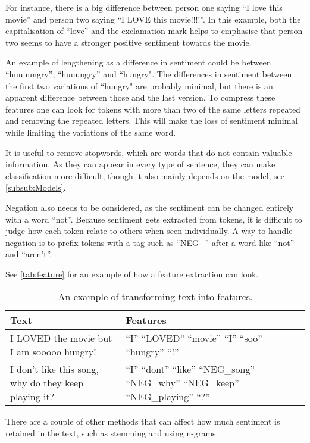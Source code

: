For instance, there is a big difference between person one saying ``I love this
movie'' and person two saying ``I LOVE this movie!!!!''. In this example, both
the capitalisation of ``love'' and the exclamation mark helps to emphasise that
person two seems to have a stronger positive sentiment towards the movie.\nl

An example of lengthening as a difference in sentiment could be between
``huuuungry'', ``huuungry'' and ``hungry". The differences in sentiment between
the first two variations of ``hungry" are probably minimal, but there is an
apparent difference between those and the last version. To compress these
features one can look for tokens with more than two of the same letters repeated
and removing the repeated letters. This will make the loss of sentiment minimal
while limiting the variations of the same word.\nl

It is useful to remove stopwords, which are words that do not contain valuable
information. As they can appear in every type of sentence, they can make
classification more difficult, though it also mainly depends on the model,
see \autoref{subsub:Models}.\nl

Negation also needs to be considered, as the sentiment can be changed entirely
with a word ``not''. Because sentiment gets extracted from tokens, it is
difficult to judge how each token relate to others when seen individually. A way
to handle negation is to prefix tokens with a tag such as ``NEG\_'' after a word
like ``not'' and ``aren't''.\nl

See \autoref{tab:feature} for an example of how a feature extraction can look.

\begin{table}[H]
\centering
\begin{tabular}{|p{6cm}|p{8cm}|}
\hline
Text & Features \\ \hline
I LOVED the movie but I am sooooo hungry! & 
``I'' ``LOVED'' ``movie'' ``I'' ``soo'' ``hungry'' ``!''
\\ \hline 
I don't like this song, why do they keep playing it? &
``I'' ``dont'' ``like'' ``NEG\_song'' ``NEG\_why'' ``NEG\_keep'' ``NEG\_playing''
``?'' \\ \hline
\end{tabular}
\caption{An example of transforming text into features.}
\label{tab:feature}
\end{table}

There are a couple of other methods that can affect how much sentiment is
retained in the text, such as stemming and using n-grams.

